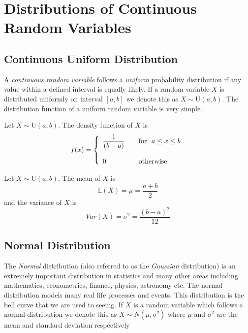 \section{Distributions of Continuous Random Variables}

\subsection{Continuous Uniform Distribution}

A \textit{continuous random variable} follows a \textit{uniform} probability distribution if any value within a defined interval is equally likely. If a random variable $X$ is distributed uniformly on interval $[a, b]$ we denote this as $X \sim \text{U}(a,b)$. The distribution function of a uniform random variable is very simple.

\hfill
\begin{pdf}
Let $X \sim \text{U}(a, b)$. The density function of $X$ is
	\[ f(x) = \left\{ 
		\begin{array}{l l}
		\displaystyle\frac{1}{(b - a)}	& \quad \text{for }  ~ a \leq x \leq b\\
		\hfill\\
		0 						& \quad \text{otherwise}
		\end{array} \right.\]
\end{pdf}

\begin{definition}
Let $X \sim \text{U}(a,b)$. The mean of $X$ is
	\begin{equation}
	\mathbb{E}(X) = \mu = \displaystyle\frac{a + b}{2}
	\end{equation}
and the variance of $X$ is
	\begin{equation}
	Var(X) = \sigma^2 = \displaystyle\frac{(b - a)^2}{12}
	\end{equation}
\end{definition}





\subsection{Normal Distribution}
\label{sectionNormalDistribution}

The \textit{Normal} distribution (also referred to as the \textit{Gaussian} distribution) is an extremely important distribution in statistics and many other areas including mathematics, econometrics, finance, physics, astronomy etc. 
The normal distribution models many real life processes and events.
This distribution is the bell curve that we are used to seeing.
If $X$ is a random variable which follows a normal distribution we denote
this as $X \sim N(\mu, \sigma^{2})$ where $\mu$ and $\sigma^{2}$ are the
mean and standard deviation respectively

